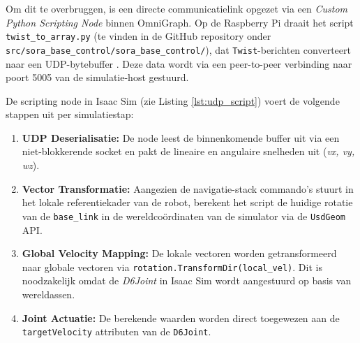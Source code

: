 Om dit te overbruggen, is een directe communicatielink opgezet via een \textit{Custom Python Scripting Node} binnen OmniGraph. Op de Raspberry Pi draait het script \texttt{twist\_to\_array.py} (te vinden in de GitHub repository onder 
\texttt{src/sora\_base\_control/sora\_base\_control/}), dat \texttt{Twist}-berichten converteert naar een UDP-bytebuffer \autocite{Wyffels2026}. Deze data wordt via een peer-to-peer verbinding naar poort 5005 van de simulatie-host gestuurd.

De scripting node in Isaac Sim (zie Listing \ref{lst:udp_script}) voert de volgende stappen uit per simulatiestap:
\begin{enumerate}
    \item \textbf{UDP Deserialisatie:} De node leest de binnenkomende buffer uit via een niet-blokkerende socket en pakt de lineaire en angulaire snelheden uit (\textit{vx, vy, wz}).
    \item \textbf{Vector Transformatie:} Aangezien de navigatie-stack commando's stuurt in het lokale referentiekader van de robot, berekent het script de huidige rotatie van de \texttt{base\_link} in de wereldcoördinaten van de simulator via de \texttt{UsdGeom} API.
    \item \textbf{Global Velocity Mapping:} De lokale vectoren worden getransformeerd naar globale vectoren via \texttt{rotation.TransformDir(local\_vel)}. Dit is noodzakelijk omdat de \textit{D6Joint} in Isaac Sim wordt aangestuurd op basis van wereldassen.
    \item \textbf{Joint Actuatie:} De berekende waarden worden direct toegewezen aan de \texttt{targetVelocity} attributen van de \texttt{D6Joint}.
\end{enumerate}


